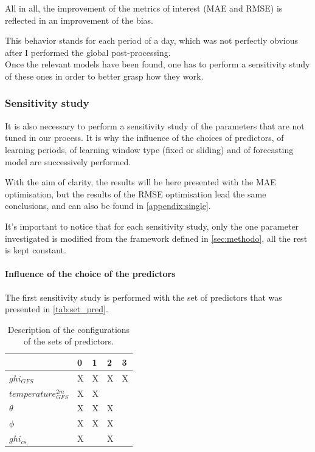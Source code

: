 All in all, the improvement of the metrics of interest (MAE and RMSE) is reflected in an improvement of the bias. 

This behavior stands for each period of a day, which was not perfectly obvious after I performed the global post-processing.\\

Once the relevant models have been found, one has to perform a sensitivity study of these ones in order to better grasp how they work.

\subsubsection{Sensitivity study}
It is also necessary to perform a sensitivity study of the parameters that are not tuned in our process. It is why the influence of the choices of predictors, of learning periods, of learning window type (fixed or sliding) and of forecasting model are successively performed. 

With the aim of clarity, the results will be here presented with the MAE optimisation, but the results of the RMSE optimisation lead the same conclusions, and can also
be found in \autoref{appendix:single}.

It's important to notice that for each sensitivity study, only the one parameter investigated is modified from the framework defined in \autoref{sec:methodo}, all the rest is kept constant.

\paragraph{Influence of the choice of the predictors}
The first sensitivity study is performed with the set of predictors that was presented in \autoref{tab:set_pred}.
\begin{table}[htb!]
\begin{center}
\begin{tabular}{|l|llll|}
\toprule
{} &  0 &  1 &  2 &  3 \\
\midrule
$ghi_{GFS}$            &  X &  X &  X &  X \\
$temperature^{2m}_{GFS}$ &  X &  X &    &    \\
$\theta$             &  X &  X &  X &    \\
$\phi$            &  X &  X &  X &    \\
$ghi_{cs}$             &  X &    &  X &    \\
\bottomrule
\end{tabular}
\end{center}
\label{tab:pred_configs}
\caption{Description of the configurations of the sets of predictors.}
\end{table}

